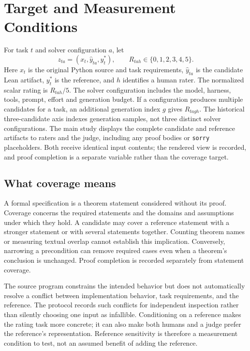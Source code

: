 \section{Target and Measurement Conditions}
\label{sec:target}
For task $t$ and solver configuration $a$, let
\begin{equation}
 z_{ta}=(x_t,\widehat y_{ta},y_t^*),
 \qquad R_{tah}\in\{0,1,2,3,4,5\}.
\end{equation}
Here $x_t$ is the original Python source and task requirements, $\widehat y_{ta}$ is the candidate Lean artifact, $y_t^*$ is the reference, and $h$ identifies a human rater.
The normalized scalar rating is $R_{tah}/5$.
The solver configuration includes the model, harness, tools, prompt, effort and generation budget.
If a configuration produces multiple candidates for a task, an additional generation index $g$ gives $R_{tagh}$.
The historical three-candidate axis indexes generation samples, not three distinct solver configurations.
The main study displays the complete candidate and reference artifacts to raters and the judge, including any proof bodies or \texttt{sorry} placeholders.
Both receive identical input contents; the rendered view is recorded, and proof completion is a separate variable rather than the coverage target.

\subsection{What coverage means}
A formal specification is a theorem statement considered without its proof.
Coverage concerns the required statements and the domains and assumptions under which they hold.
A candidate may cover a reference statement with a stronger statement or with several statements together.
Counting theorem names or measuring textual overlap cannot establish this implication.
Conversely, narrowing a precondition can remove required cases even when a theorem's conclusion is unchanged.
Proof completion is recorded separately from statement coverage.

The source program constrains the intended behavior but does not automatically resolve a conflict between implementation behavior, task requirements, and the reference.
The protocol records such conflicts for independent inspection rather than silently choosing one input as infallible.
Conditioning on a reference makes the rating task more concrete; it can also make both humans and a judge prefer the reference's representation.
Reference sensitivity is therefore a measurement condition to test, not an assumed benefit of adding the reference.

